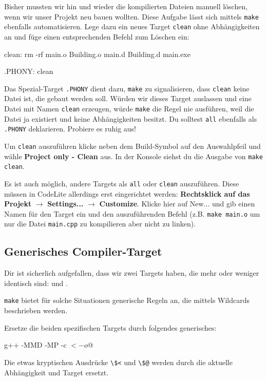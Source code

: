 Bisher mussten wir hin und wieder die kompilierten Dateien manuell löschen, wenn wir unser Projekt neu bauen wollten.
Diese Aufgabe lässt sich mittels \texttt{make} ebenfalls automatisieren. Lege dazu ein neues Target \texttt{clean} ohne Abhängigkeiten an und füge einen entsprechenden Befehl zum Löschen ein:
\begin{lstmake}
clean:
    rm -rf main.o Building.o main.d Building.d main.exe

.PHONY: clean
\end{lstmake}
Das Spezial-Target \texttt{.PHONY} dient dazu, \texttt{make} zu signalisieren, dass \texttt{clean} keine Datei ist, die gebaut werden soll.
Würden wir dieses Target auslassen und eine Datei mit Namen \texttt{clean} erzeugen, würde \texttt{make} die Regel nie ausführen, weil die Datei ja existiert und keine Abhängigkeiten besitzt.
Du solltest \texttt{all} ebenfalls als \texttt{.PHONY} deklarieren.
Probiere es ruhig aus!

Um \texttt{clean} auszuführen klicke neben dem Build-Symbol auf den Auswahlpfeil und wähle \textbf{Project only - Clean} aus. In der Konsole siehst du die Ausgabe von \texttt{make clean}.

Es ist auch möglich, andere Targets als \texttt{all} oder \texttt{clean} auszuführen. Diese müssen in CodeLite allerdings erst eingerichtet werden: \textbf{Rechtsklick auf das Projekt} $\to$ \textbf{Settings...} $\to$ \textbf{Customize}. Klicke hier auf New... und gib einen Namen für den Target ein und den auszuführenden Befehl (z.B. \texttt{make main.o} um nur die Datei \texttt{main.cpp} zu kompilieren aber nicht zu linken).

\subsection{Generisches Compiler-Target}

Dir ist sicherlich aufgefallen, dass wir zwei Targets haben, die mehr oder weniger identisch sind:  und .

\texttt{make} bietet für solche Situationen generische Regeln an, die mittels Wildcards beschrieben werden.

Ersetze die beiden spezifischen Targets durch folgendes generisches:
\begin{lstmake}
    g++ -MMD -MP -c $< -o $@
\end{lstmake}
Die etwas kryptischen Ausdrücke \lstinline{\$<} und \lstinline{\$@} werden durch die aktuelle Abhängigkeit und Target ersetzt.

